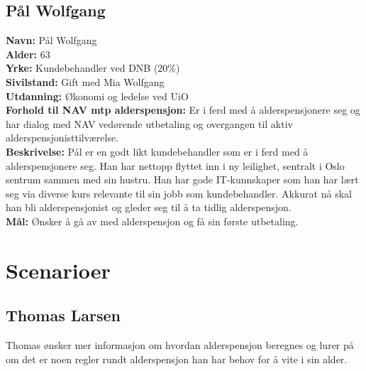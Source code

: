 \documentclass[informationsecurity]{gucmasterproject}
\begin{document}
\subsection{Pål Wolfgang}
\textbf{Navn:} Pål Wolfgang \\
\textbf{Alder:} 63 \\
\textbf{Yrke:} Kundebehandler ved DNB (20\%) \\
\textbf{Sivilstand:} Gift med Mia Wolfgang \\
\textbf{Utdanning:} Økonomi og ledelse ved UiO \\
\textbf{Forhold til NAV mtp alderspensjon:} Er i ferd med å alderspensjonere seg og har dialog med NAV vedørende utbetaling og overgangen til aktiv alderspensjonisttilværelse. \\
\textbf{Beskrivelse:} Pål er en godt likt kundebehandler som er i ferd med å alderspensjonere seg. Han har nettopp flyttet inn i ny leilighet, sentralt i Oslo sentrum sammen med sin hustru. Han har gode IT-kunnskaper som han har lært seg via diverse kurs relevante til sin jobb som kundebehandler. Akkurat nå skal han bli alderspensjonist og gleder seg til å ta tidlig alderspensjon. \\
\textbf{Mål:} Ønsker å gå av med alderspensjon og få sin første utbetaling.


\section{Scenarioer}
\subsection{Thomas Larsen}
Thomas ønsker mer informasjon om hvordan alderspensjon beregnes og lurer på om det er noen regler rundt alderspensjon han har behov for å vite i sin alder.
\end{document}
